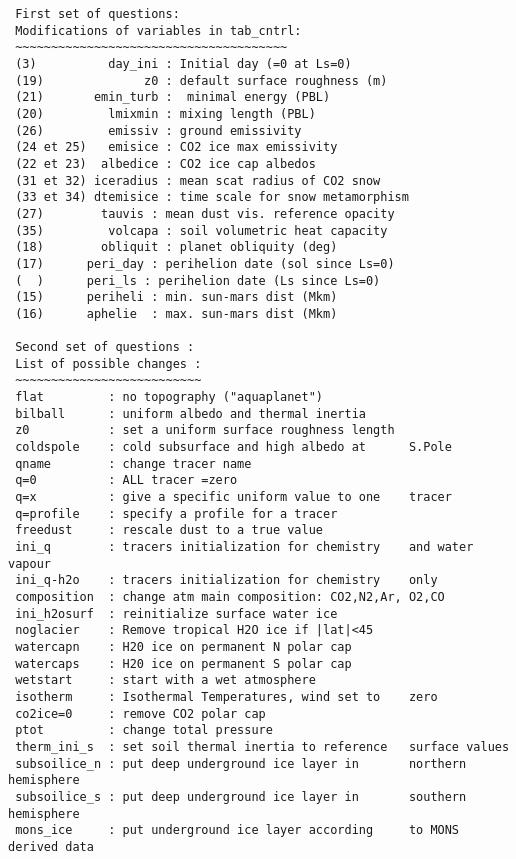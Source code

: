 {\footnotesize
\begin{verbatim}
 First set of questions:
 Modifications of variables in tab_cntrl:
 ~~~~~~~~~~~~~~~~~~~~~~~~~~~~~~~~~~~~~~
 (3)          day_ini : Initial day (=0 at Ls=0)
 (19)              z0 : default surface roughness (m)
 (21)       emin_turb :  minimal energy (PBL)
 (20)         lmixmin : mixing length (PBL)
 (26)         emissiv : ground emissivity
 (24 et 25)   emisice : CO2 ice max emissivity 
 (22 et 23)  albedice : CO2 ice cap albedos
 (31 et 32) iceradius : mean scat radius of CO2 snow
 (33 et 34) dtemisice : time scale for snow metamorphism
 (27)        tauvis : mean dust vis. reference opacity
 (35)         volcapa : soil volumetric heat capacity
 (18)        obliquit : planet obliquity (deg)
 (17)      peri_day : perihelion date (sol since Ls=0)
 (  )      peri_ls : perihelion date (Ls since Ls=0)
 (15)      periheli : min. sun-mars dist (Mkm)
 (16)      aphelie  : max. sun-mars dist (Mkm)

 Second set of questions :
 List of possible changes :
 ~~~~~~~~~~~~~~~~~~~~~~~~~~
 flat         : no topography ("aquaplanet")
 bilball      : uniform albedo and thermal inertia
 z0           : set a uniform surface roughness length
 coldspole    : cold subsurface and high albedo at      S.Pole
 qname        : change tracer name
 q=0          : ALL tracer =zero
 q=x          : give a specific uniform value to one    tracer
 q=profile    : specify a profile for a tracer
 freedust     : rescale dust to a true value
 ini_q        : tracers initialization for chemistry    and water vapour
 ini_q-h2o    : tracers initialization for chemistry    only
 composition  : change atm main composition: CO2,N2,Ar, O2,CO
 ini_h2osurf  : reinitialize surface water ice 
 noglacier    : Remove tropical H2O ice if |lat|<45
 watercapn    : H20 ice on permanent N polar cap 
 watercaps    : H20 ice on permanent S polar cap 
 wetstart     : start with a wet atmosphere
 isotherm     : Isothermal Temperatures, wind set to    zero
 co2ice=0     : remove CO2 polar cap
 ptot         : change total pressure
 therm_ini_s  : set soil thermal inertia to reference   surface values
 subsoilice_n : put deep underground ice layer in       northern hemisphere
 subsoilice_s : put deep underground ice layer in       southern hemisphere
 mons_ice     : put underground ice layer according     to MONS derived data

\end{verbatim}
}
